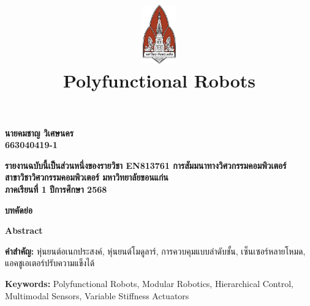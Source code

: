 \documentclass[a4paper]{article}
\date{}
\author{}
\title{
    \includegraphics[width=1in, height=1in, keepaspectratio]{logo.png}
    \\[2ex]
    {\fontsize{32pt}{36pt}\selectfont\textbf{Polyfunctional Robots}}
}
\begin{document}
\maketitle
\thispagestyle{empty}

\vfill
\begin{center}
    {\fontsize{22pt}{26pt}\selectfont\textbf{
        นายคมชาญ วิเศษนคร
        \\ 663040419-1
    }}
\end{center}
\vfill

\vfill
\begin{center}
    {\fontsize{16pt}{20pt}\selectfont\textbf{
        รายงานฉบับนี้เป็นส่วนหนึ่งของรายวิชา EN813761 การสัมมนาทางวิศวกรรมคอมพิวเตอร์
        \\ สาขาวิชาวิศวกรรมคอมพิวเตอร์ มหาวิทยาลัยขอนแก่น
        \\ ภาคเรียนที่ 1 ปีการศึกษา 2568
    }}
\end{center}

\newpage

\setcounter{page}{1}

{\centering
    {\fontsize{18pt}{21.6pt}\selectfont\textbf{บทคัดย่อ}\par}
}
\vspace{1em}


\vspace{1em}

{\centering
    {\fontsize{18pt}{21.6pt}\selectfont\textbf{Abstract}\par}
}
\vspace{1em}


\vspace{1em}

\noindent
\textbf{คำสำคัญ:} หุ่นยนต์อเนกประสงค์, หุ่นยนต์โมดูลาร์, การควบคุมแบบลำดับชั้น, เซ็นเซอร์หลายโหมด, แอคชูเอเตอร์ปรับความแข็งได้

\vspace{0.5em}

\noindent
\textbf{Keywords:} Polyfunctional Robots, Modular Robotics, Hierarchical Control, Multimodal Sensors, Variable Stiffness Actuators

\newpage

\tableofcontents
\newpage
\end{document}
